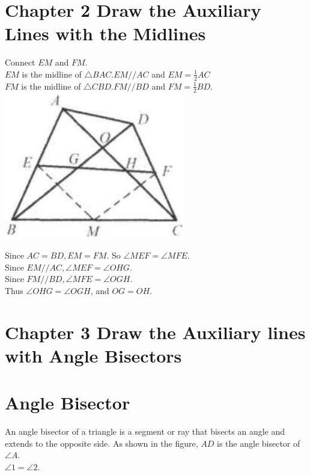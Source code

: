 \documentclass[10pt]{article}
\begin{document}
\section*{Chapter 2 Draw the Auxiliary Lines with the Midlines}
Connect \(E M\) and \(F M\).\\
\(E M\) is the midline of \(\triangle B A C . E M / / A C\) and \(E M=\frac{1}{2} A C\)\\
\(F M\) is the midline of \(\triangle C B D . F M / / B D\) and \(F M=\frac{1}{2} B D\).\\
\includegraphics[max width=\textwidth, center]{2025_04_17_97bc1f7e44d93c271a88g-052}

Since \(A C=B D, E M=F M\). So \(\angle M E F=\angle M F E\).\\
Since \(E M / / A C, \angle M E F=\angle O H G\).\\
Since \(F M / / B D, \angle M F E=\angle O G H\).\\
Thus \(\angle O H G=\angle O G H\), and \(O G=O H\).

\section*{Chapter 3 Draw the Auxiliary lines with Angle Bisectors}
\section*{Angle Bisector}
An angle bisector of a triangle is a segment or ray that bisects an angle and extends to the opposite side. As shown in the figure, \(A D\) is the angle bisector of \(\angle A\).\\
\(\angle 1=\angle 2\).
\end{document}
